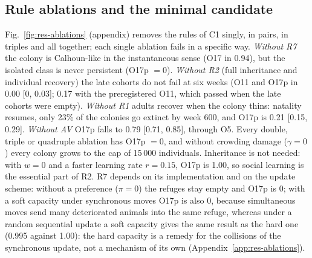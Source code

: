 \subsection{Rule ablations and the minimal candidate}
\label{sec:res-ablations}

Fig.~\ref{fig:res-ablations} (appendix) removes the rules of \textsf{C1} singly, in pairs, in triples and all
together; each single ablation fails in a specific way. \emph{Without R7} the colony is Calhoun-like in the
instantaneous sense (O17 in 0.94), but the isolated class is never persistent (O17p $=0$). \emph{Without R2} (full
inheritance and individual recovery) the late cohorts do not fail at six weeks (O11 and O17p in 0.00 [0, 0.03]; 0.17 with the
preregistered O11, which passed when the late cohorts were empty). \emph{Without R1} adults recover when the colony
thins: natality resumes, only 23\% of the colonies go extinct by week 600, and O17p is 0.21 [0.15, 0.29].
\emph{Without AV} O17p falls to 0.79 [0.71, 0.85], through O5. Every double, triple or quadruple ablation has O17p
$=0$, and without crowding damage ($\gamma=0$) every colony grows to the cap of 15\,000 individuals. Inheritance is
not needed: with $w=0$ and a faster learning rate $r=0.15$, O17p is 1.00, so social learning is the essential part of
R2. R7 depends on its implementation and on the update scheme: without a preference ($\pi=0$) the refuges stay empty
and O17p is 0; with a soft capacity under synchronous moves O17p is also 0, because simultaneous moves send many
deteriorated animals into the same refuge, whereas under a random sequential update a soft capacity gives the same
result as the hard one (0.995 against 1.00): the hard capacity is a remedy for the collisions of the synchronous
update, not a mechanism of its own (Appendix~\ref{app:res-ablations}).

